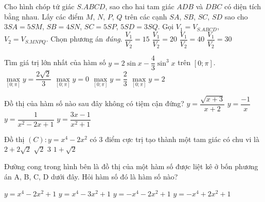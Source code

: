 \begin{ex}%
Cho hình chóp tứ giác $S.ABCD$, sao cho hai tam giác $ADB$ và $DBC$ có diện tích bằng nhau. Lấy các điểm $M$, $N$, $P$, $Q$ trên các cạnh $SA$, $SB$, $SC$, $SD$ sao cho $3SA = 5SM$, $SB = 4SN$, $SC = 5SP$, $5SD = 3SQ$. Gọi $V_1 = {{V}_{S. ABCD}}$, $V_2 = {{V}_{S. MNPQ}}$. Chọn phương án \textit{đúng}.
\choice
{$\dfrac{V_1}{V_2} = 15$}
{\True $\dfrac{V_1}{V_2} = 20$}
{$\dfrac{V_1}{V_2} = 40$}
{$\dfrac{V_1}{V_2} = 30$}
\end{ex}
\begin{ex}%
Tìm giá trị lớn nhất của hàm số $y = 2\sin x - \dfrac{4}{3}{\sin}^3x$ trên $\left[0; \pi\right]$.
\choice
{\True $\underset{[0; \pi]}{\mathop{\max}} y = \dfrac{2\sqrt{2}}{3}$}
{$\underset{[0; \pi]}{\mathop{\max}} y = 0$}
{$\underset{[0; \pi]}{\mathop{\max}} y = \dfrac{2}{3}$}
{$\underset{[0; \pi]}{\mathop{\max}} y = 2$}
\end{ex}
\begin{ex}%
Đồ thị của hàm số nào sau đây không có tiệm cận đứng?
\choice
{$y = \dfrac{\sqrt{x + 3}}{x + 2}$}
{$y = \dfrac{ - 1}{x}$}
{$y = \dfrac{1}{x^2 - 2x + 1}$}
{\True $y = \dfrac{3x - 1}{x^2 + 1}$}
\end{ex}
\begin{ex}%
Đồ thị $(C):y = x^4 - 2x^2$ có $3$ điểm cực trị tạo thành một tam giác có chu vi là
\choice
{\True $2 + 2\sqrt{2}$}
{$\sqrt{2}$}
{3}
{$1 + \sqrt{2}$}
\end{ex}
\begin{ex}%
Đường cong trong hình bên là đồ thị của một hàm số được liệt kê ở bốn phương án A, B, C, D dưới đây. Hỏi hàm số đó là hàm số nào?
\begin{center}
\end{center}
\choice
{$y = x^4 - 2x^2 + 1$}
{$y = x^4 - 3x^2 + 1$}
{$y = - x^4 - 2x^2 + 1$}
{\True $y = - x^4 + 2x^2 + 1$}
\end{ex}
